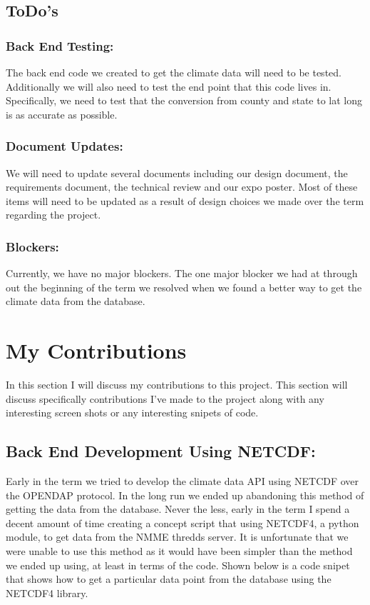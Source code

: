 \documentclass[onecolumn, draftclsnofoot,10pt, compsoc]{article}
\begin{document}
	\subsection{ToDo's}
		\subsubsection{Back End Testing:}
		The back end code we created to get the climate data will need to be tested. Additionally we will also need to test the end point that this code lives in. Specifically, we need to test that the conversion from county and state to lat long is as accurate as possible.\\
		
		\subsubsection{Document Updates:}
		We will need to update several documents including our design document, the requirements document, the technical review and our expo poster. Most of these items will need to be updated as a result of design choices we made over the term regarding the project.\\

		\subsubsection{Blockers:}
		Currently, we have no major blockers. The one major blocker we had at through out the beginning of the term we resolved when we found a better way to get the climate data from the database.\\

\section{My Contributions}
	In this section I will discuss my contributions to this project. This section will discuss specifically contributions I've made to the project along with any interesting screen shots or any interesting snipets of code.\\

		\subsection{Back End Development Using NETCDF:}
		Early in the term we tried to develop the climate data API using NETCDF over the OPENDAP protocol. In the long run we ended up abandoning this method of getting the data from the database. Never the less, early in the term I spend a decent amount of time creating a concept script that using NETCDF4, a python module, to get data from the NMME thredds server. It is unfortunate that we were unable to use this method as it would have been simpler than the method we ended up using, at least in terms of the code. Shown below is a code snipet that shows how to get a particular data point from the database using the NETCDF4 library.\\
		
\end{document}
